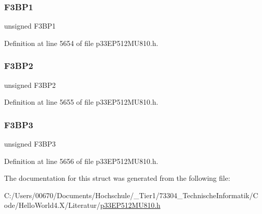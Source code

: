 \subsubsection{\texorpdfstring{F3\+B\+P1}{F3BP1}}
{\footnotesize\ttfamily unsigned F3\+B\+P1}



Definition at line 5654 of file p33\+E\+P512\+M\+U810.\+h.

\mbox{\label{structtag_c2_b_u_f_p_n_t1_b_i_t_s_a1e75d1073b686abfd1137ee647ae3147}} 
\subsubsection{\texorpdfstring{F3\+B\+P2}{F3BP2}}
{\footnotesize\ttfamily unsigned F3\+B\+P2}



Definition at line 5655 of file p33\+E\+P512\+M\+U810.\+h.

\mbox{\label{structtag_c2_b_u_f_p_n_t1_b_i_t_s_aee9920932ab1a451012ad6a2f4afaa19}} 
\subsubsection{\texorpdfstring{F3\+B\+P3}{F3BP3}}
{\footnotesize\ttfamily unsigned F3\+B\+P3}



Definition at line 5656 of file p33\+E\+P512\+M\+U810.\+h.



The documentation for this struct was generated from the following file\+:\begin{DoxyCompactItemize}
\item 
C\+:/\+Users/00670/\+Documents/\+Hochschule/\+\_\+\+Tier1/73304\+\_\+\+Technische\+Informatik/\+Code/\+Hello\+World4.\+X/\+Literatur/\hyperlink{p33_e_p512_m_u810_8h}{p33\+E\+P512\+M\+U810.\+h}\end{DoxyCompactItemize}
